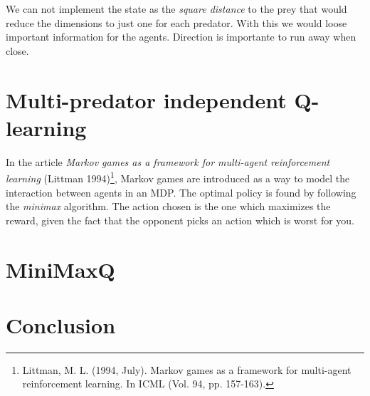 \documentclass{article}
\begin{document}
We can not implement the state as the \emph{square distance} to the prey that
would reduce the dimensions to just one for each predator. With this we would
loose important information for the agents. Direction is importante to run away
when close.

\section{Multi-predator independent Q-learning}
In the article \emph{Markov games as a framework for multi-agent reinforcement learning} (Littman 1994)\footnote{Littman, M. L. (1994, July). Markov games as a framework for multi-agent reinforcement learning. In ICML (Vol. 94, pp. 157-163).}, Markov games are introduced as a way to model the interaction between agents in an MDP. The optimal policy is found by following the \emph{minimax} algorithm. The action chosen is the one which maximizes the reward, given the fact that the opponent picks an action which is worst for you.
\section{MiniMaxQ}

\section{Conclusion}
\end{document}
